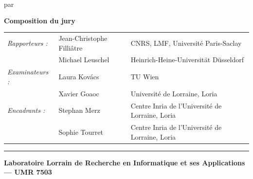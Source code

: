 \begin{minipage}[t][\textheight][s]{\textwidth}
    \vspace{4mm}

    \begin{center}
      {\normalsize par\par}
      \vspace{2mm}
      {\large \ThesisAuthor\par}
    \end{center}

    \vfill

    {\small\bfseries Composition du jury}

    \vspace{2mm}
    \begin{center}
    {\small
    \begin{tabular}{@{}lll@{}}
      \textit{Rapporteurs :}    & Jean-Christophe Filli\^atre  & CNRS, LMF, Université Paris-Saclay \\[2mm]
                                & Michael Leuschel  & Heinrich-Heine-Universität Düsseldorf \\[4mm]
      \textit{Examinateurs :}   & Laura Kov\'acs  & TU Wien \\[2mm]
                                & Xavier Goaoc  & Université de Lorraine, Loria \\[4mm]
      \textit{Encadrants :}     & Stephan Merz     & Centre Inria de l'Université de Lorraine, Loria \\ [2mm]
                                & Sophie Tourret   & Centre Inria de l'Université de Lorraine, Loria
    \end{tabular}
    }
    \end{center}

    \vfill

    {\rule{\textwidth}{\TPrule}}
    \vspace{2mm}
    \begin{center}
      {\small\bfseries
        Laboratoire Lorrain de Recherche en Informatique et ses
        Applications --- UMR 7503\par}
    \end{center}

  \end{minipage}%

  \restoregeometry
\endgroup
\clearpage
